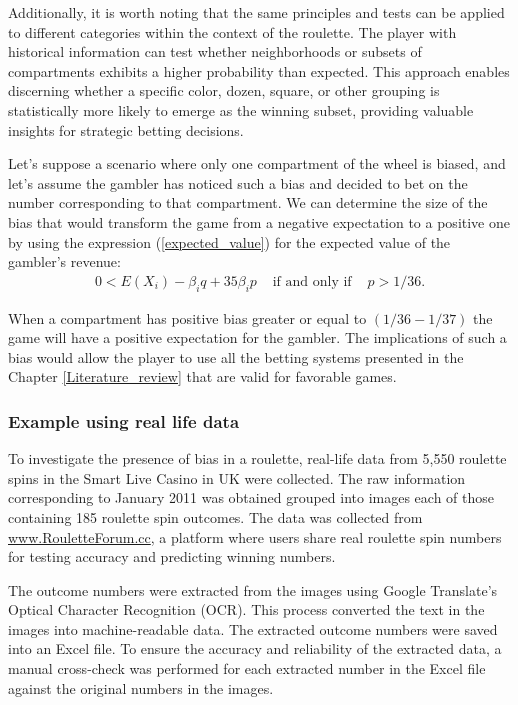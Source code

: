 \documentclass[11pt,twoside]{article}
\numberwithin{Theorem}{section}
\numberwithin{Definition}{section}
\numberwithin{Lemma}{section}
\numberwithin{Algorithm}{section}
\numberwithin{equation}{section}
\begin{document}
Additionally, it is worth noting that the same principles and tests can be applied to different categories within the context of the roulette. The player with historical information can test whether neighborhoods or subsets of compartments exhibits a higher probability than expected. This approach enables discerning whether a specific color, dozen, square, or other grouping is statistically more likely to emerge as the winning subset, providing valuable insights for strategic betting decisions.
 
Let's suppose a scenario where only one compartment of the wheel is biased, and let's assume the gambler has noticed such a bias and decided to bet on the number corresponding to that compartment. We can determine the size of the bias that would transform the game from a negative expectation to a positive one by using the expression (\ref{expected_value}) for the expected value of the gambler's revenue:
\begin{eqnarray}
0 < E(X_{i}) -\beta_{i}q +35\beta_{i}p & \text{ if and only if }& p > 1/36.
\end{eqnarray}

When a compartment has positive bias greater or equal to $(1/36 - 1/37)$ the game will have a positive expectation for the gambler. The implications of such a bias would allow the player to use all the betting systems presented in the Chapter \ref{Literature_review} that are valid for favorable games.

\subsubsection{Example using real life data}
To investigate the presence of bias in a roulette, real-life data from 5,550 roulette spins in the Smart Live Casino in UK were collected. The raw information corresponding to January 2011 was obtained grouped into images each of those containing 185 roulette spin outcomes. The data was collected from \url{www.RouletteForum.cc}, a platform where users share real roulette spin numbers for testing accuracy and predicting winning numbers.

The outcome numbers were extracted from the images using Google Translate's Optical Character Recognition (OCR). This process converted the text in the images into machine-readable data. The extracted outcome numbers were saved into an Excel file. To ensure the accuracy and reliability of the extracted data, a manual cross-check was performed for each extracted number in the Excel file against the original numbers in the images.
\end{document}
